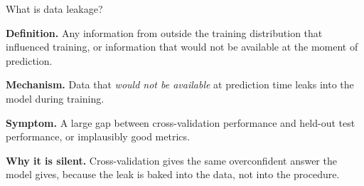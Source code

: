 \documentclass[10pt,compress,t,notes=noshow, xcolor=table]{beamer}
\begin{document}
\begin{frame}{What is data leakage?}
\label{leakage-definition}

\textbf{Definition.} Any information from outside the training distribution that influenced training, or information that would not be available at the moment of prediction.

\bigskip

\textbf{Mechanism.} Data that \textit{would not be available} at prediction time leaks into the model during training.

\bigskip

\textbf{Symptom.} A large gap between cross-validation performance and held-out test performance, or implausibly good metrics.

\bigskip

\textbf{Why it is silent.} Cross-validation gives the same overconfident answer the model gives, because the leak is baked into the data, not into the procedure.

\end{frame}
\end{document}
